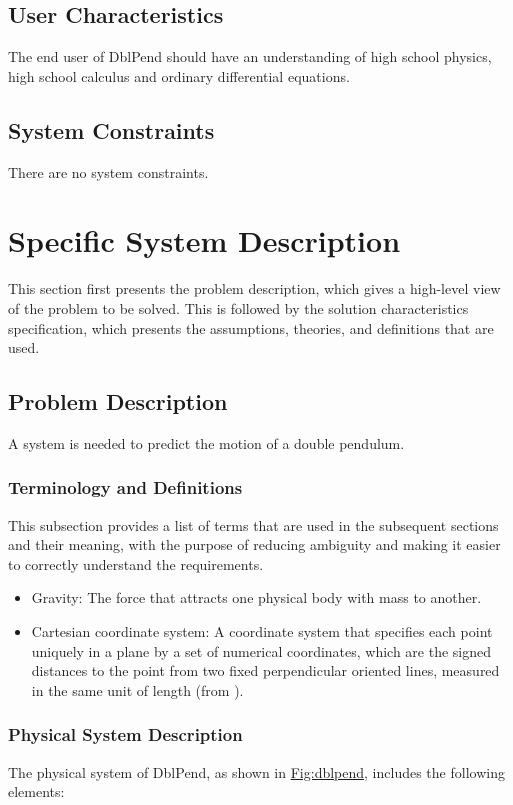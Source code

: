 \documentclass[12pt]{article}
\begin{document}
{\subsection{User Characteristics}
\label{Sec:UserChars}
The end user of DblPend should have an understanding of high school physics, high school calculus and ordinary differential equations.

\subsection{System Constraints}
\label{Sec:SysConstraints}
There are no system constraints.

\section{Specific System Description}
\label{Sec:SpecSystDesc}
This section first presents the problem description, which gives a high-level view of the problem to be solved. This is followed by the solution characteristics specification, which presents the assumptions, theories, and definitions that are used.

\subsection{Problem Description}
\label{Sec:ProbDesc}
A system is needed to predict the motion of a double pendulum.

\subsubsection{Terminology and Definitions}
\label{Sec:TermDefs}
This subsection provides a list of terms that are used in the subsequent sections and their meaning, with the purpose of reducing ambiguity and making it easier to correctly understand the requirements.

\begin{itemize}
\item{Gravity: The force that attracts one physical body with mass to another.}
\item{Cartesian coordinate system: A coordinate system that specifies each point uniquely in a plane by a set of numerical coordinates, which are the signed distances to the point from two fixed perpendicular oriented lines, measured in the same unit of length (from \cite{cartesianWiki}).}
\end{itemize}
\subsubsection{Physical System Description}
\label{Sec:PhysSyst}
The physical system of DblPend, as shown in \hyperref[Figure:dblpend]{Fig:dblpend}, includes the following elements:

}
\end{document}
